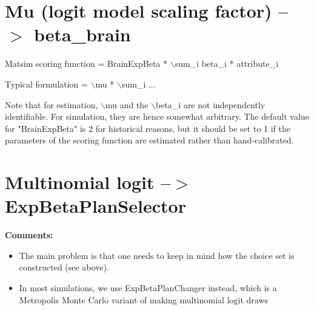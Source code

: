 \documentclass[a4paper,11pt]{report}
\begin{document}
\vfill\eject
\section{Mu (logit model scaling factor) --$>$ beta\_brain}



Matsim scoring function = BrainExpBeta * $\backslash$sum\_i beta\_i * attribute\_i

Typical formulation = $\backslash$mu * $\backslash$sum\_i ...

Note that for estimation, $\backslash$mu and the $\backslash$beta\_i are not independently  identifiable. For simulation, they are hence somewhat arbitrary. The  default value for "BrainExpBeta" is 2 for historical reasons, but it  should be set to 1 if the parameters of the scoring function are  estimated rather than hand-calibrated.

\vfill\eject
\section{Multinomial logit --$>$ ExpBetaPlanSelector}



\textbf{Comments:}
\begin{itemize}
	\item The main problem is that one needs to keep in mind how the choice set is constructed (see above).
	\item In most simulations, we use ExpBetaPlanChanger instead, which is a   Metropolis Monte Carlo variant of making multinomial logit draws
\end{itemize}
\end{document}
